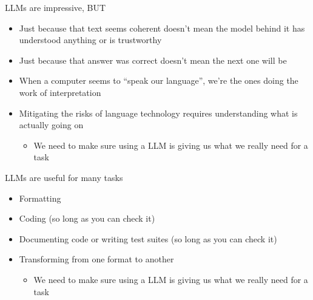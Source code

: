 

\begin{frame}{LLMs are impressive, BUT}

\begin{itemize}
\item  Just because that text seems coherent doesn’t mean the model behind it has
understood anything or is trustworthy
\item  Just because that answer was correct doesn’t mean the next one will be
\item  When a computer seems to “speak our language”, we’re the ones
doing the work of interpretation
\item Mitigating the risks of language technology requires understanding what is actually going on
  \begin{itemize}
  \item We need to make sure using a LLM is giving us what we really need for a task
  \end{itemize}
\end{itemize}
\end{frame}

\begin{frame}{LLMs are useful for many tasks}

\begin{itemize}
\item  Formatting
\item  Coding (so long as you can check it)
\item  Documenting code or writing test suites  (so long as you can check it)
  
\item Transforming from one format to another
  \begin{itemize}
  \item We need to make sure using a LLM is giving us what we really need for a task
  \end{itemize}
\end{itemize}


\end{frame}

